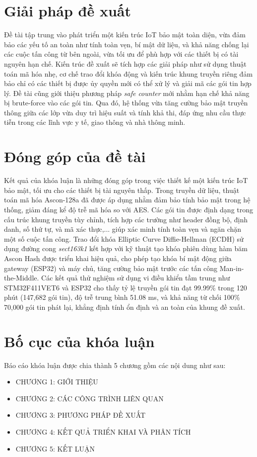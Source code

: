 \section{Giải pháp đề xuất}
Đề tài tập trung vào phát triển một kiến trúc IoT bảo mật toàn diện, vừa đảm bảo các yếu tố an toàn như tính toàn vẹn, bí mật dữ liệu, và khả năng chống lại các cuộc tấn công từ bên ngoài, vừa tối ưu để phù hợp với các thiết bị có tài nguyên hạn chế. Kiến trúc đề xuất sẽ tích hợp các giải pháp như sử dụng thuật toán mã hóa nhẹ, cơ chế trao đổi khóa động và kiến trúc khung truyền riêng đảm bảo chỉ có các thiết bị được ủy quyền mới có thể xử lý và giải mã các gói tin hợp lý. Đề tài cũng giới thiệu phương pháp \textit{safe counter} mới nhằm hạn chế khả năng bị brute-force vào các gói tin. Qua đó, hệ thống vừa tăng cường bảo mật truyền thông giữa các lớp vừa duy trì hiệu suất và tính khả thi, đáp ứng nhu cầu thực tiễn trong các lĩnh vực y tế, giao thông và nhà thông minh.

\section{Đóng góp của đề tài}
Kết quả của khóa luận là những đóng góp trong việc thiết kế một kiến trúc IoT bảo mật, tối ưu cho các thiết bị tài nguyên thấp. Trong truyền dữ liệu, thuật toán mã hóa Ascon-128a đã được áp dụng nhằm đảm bảo tính bảo mật trong hệ thống, giảm đáng kể độ trễ mã hóa so với AES. Các gói tin được định dạng trong cấu trúc khung truyền tùy chỉnh, tích hợp các trường như header đồng bộ, định danh, số thứ tự, và mã xác thực,... giúp xác minh tính toàn vẹn và ngăn chặn một số cuộc tấn công. Trao đổi khóa Elliptic Curve Diffie-Hellman (ECDH) sử dụng đường cong \textit{sect163k1} kết hợp với kỹ thuật tạo khóa phiên dùng hàm băm Ascon Hash được triển khai hiệu quả, cho phép tạo khóa bí mật động giữa gateway (ESP32) và máy chủ, tăng cường bảo mật trước các tấn công Man-in-the-Middle. Các kết quả thử nghiệm sử dụng vi điều khiển tầm trung như STM32F411VET6 và ESP32 cho thấy tỷ lệ truyền gói tin đạt 99.99\% trong 120 phút (147,682 gói tin), độ trễ trung bình 51.08 ms, và khả năng từ chối 100\% 70,000 gói tin phát lại, khẳng định tính ổn định và an toàn của khung đề xuất. 

\section{Bố cục của khóa luận}

Báo cáo khóa luận được chia thành 5 chương gồm các nội dung như sau:
\begin{itemize}
    \item CHƯƠNG 1: GIỚI THIỆU
    \item CHƯƠNG 2: CÁC CÔNG TRÌNH LIÊN QUAN
    \item CHƯƠNG 3: PHƯƠNG PHÁP ĐỀ XUẤT
    \item CHƯƠNG 4: KẾT QUẢ TRIỂN KHAI VÀ PHÂN TÍCH
    \item CHƯƠNG 5: KẾT LUẬN
\end{itemize}

